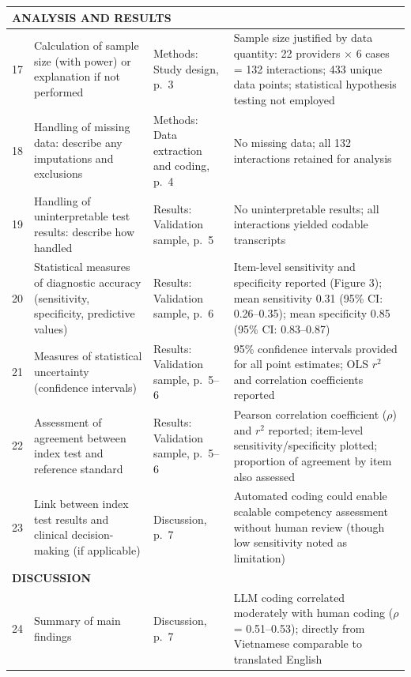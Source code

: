 \documentclass{article}
\begin{document}
\begin{table}[htbp]
\begin{tabularx}{\textwidth}{|p{0.8cm}|p{5.5cm}|p{6.5cm}|p{3cm}|}
\multicolumn{4}{l}{\textbf{ANALYSIS AND RESULTS}} \\
\hline

17 & Calculation of sample size (with power) or explanation if not performed & Methods: Study design, p.\ 3 & Sample size justified by data quantity: 22 providers $\times$ 6 cases = 132 interactions; 433 unique data points; statistical hypothesis testing not employed \\
\hline

18 & Handling of missing data: describe any imputations and exclusions & Methods: Data extraction and coding, p.\ 4 & No missing data; all 132 interactions retained for analysis \\
\hline

19 & Handling of uninterpretable test results: describe how handled & Results: Validation sample, p.\ 5 & No uninterpretable results; all interactions yielded codable transcripts \\
\hline

20 & Statistical measures of diagnostic accuracy (sensitivity, specificity, predictive values) & Results: Validation sample, p.\ 6 & Item-level sensitivity and specificity reported (Figure 3); mean sensitivity 0.31 (95\% CI: 0.26--0.35); mean specificity 0.85 (95\% CI: 0.83--0.87) \\
\hline

21 & Measures of statistical uncertainty (confidence intervals) & Results: Validation sample, p.\ 5--6 & 95\% confidence intervals provided for all point estimates; OLS $r^{2}$ and correlation coefficients reported \\
\hline

22 & Assessment of agreement between index test and reference standard & Results: Validation sample, p.\ 5--6 & Pearson correlation coefficient ($\rho$) and $r^{2}$ reported; item-level sensitivity/specificity plotted; proportion of agreement by item also assessed \\
\hline

23 & Link between index test results and clinical decision-making (if applicable) & Discussion, p.\ 7 & Automated coding could enable scalable competency assessment without human review (though low sensitivity noted as limitation) \\
\hline

\multicolumn{4}{l}{\textbf{DISCUSSION}} \\
\hline

24 & Summary of main findings & Discussion, p.\ 7 & LLM coding correlated moderately with human coding ($\rho$ = 0.51--0.53); directly from Vietnamese comparable to translated English \\
\hline


\end{tabularx}
\end{table}
\end{document}
